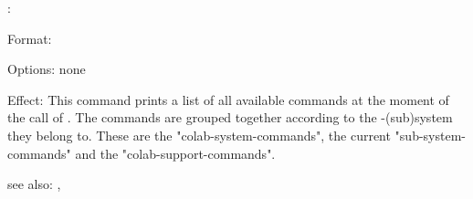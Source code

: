 \colab{} \cmds:

Format: 

Options: none

Effect: This command prints a list of all available commands at the
	moment of the call of \cmds. The commands are grouped
        together according to the \COLAB{}-(sub)system they belong
        to. These are the "colab-system-commands", the current 
        "sub-system-commands" and the "colab-support-commands".

see also: \tables, \?
